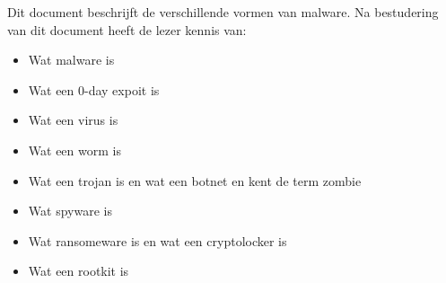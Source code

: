 Dit document beschrijft de verschillende vormen van malware. Na bestudering van dit document heeft de lezer kennis van:
\begin{itemize}
	\item Wat malware is
\item Wat een 0-day expoit is
\item Wat een virus is
\item Wat een worm is
\item Wat een trojan is en wat een botnet en kent de term zombie
\item Wat spyware is
\item Wat ransomeware is en wat een cryptolocker is
\item Wat een rootkit is
\end{itemize}

